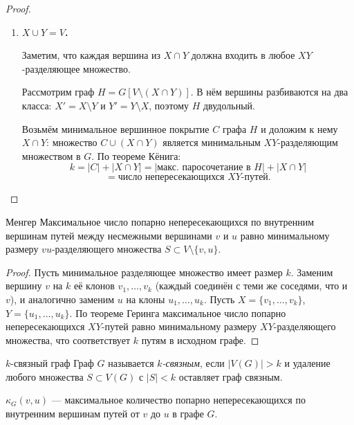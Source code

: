 \begin{proof}
\begin{enumerate}
\begin{enumerate}
			\item \textbf{$X \cup Y = V$.}
			
			Заметим, что каждая вершина из $X \cap Y$ должна входить
			в любое $XY$-разделяющее множество.
			
			Рассмотрим граф $H = G[V \setminus (X \cap Y)]$.
			В нём вершины разбиваются на два класса:
			$X' = X \setminus Y$ и
			$Y' = Y \setminus X$,
			поэтому $H$ двудольный.
			
			Возьмём минимальное вершинное покрытие $C$ графа $H$
			и доложим к нему $X \cap Y$: множество $C \cup (X \cap Y)$
			является минимальным $XY$-разделяющим множеством в $G$.
			По теореме Кёнига:
			\[
			k
			= \bigl|C\bigr| + \bigl|X \cap Y\bigr|
			= \bigl|\text{макс. паросочетание в } H\bigr|
			+ \bigl|X \cap Y\bigr| 
			\]
			\[
			= \text{число непересекающихся } XY\text{-путей.}
			\]
		\end{enumerate}
	\end{enumerate}
\end{proof}

\begin{Theorem}{Менгер}{}
	Максимальное число попарно непересекающихся по внутренним
	вершинам путей между несмежными вершинами $v$ и $u$ равно
	минимальному размеру $vu$-разделяющего множества
	$S \subset V \setminus \{v, u\}$.
\end{Theorem}
\begin{proof}
	Пусть минимальное разделяющее множество имеет размер $k$.
	Заменим вершину $v$ на $k$ её клонов $v_1, \ldots, v_k$
	(каждый соединён с теми же соседями, что и $v$),
	и аналогично заменим $u$ на клоны $u_1, \ldots, u_k$.
	Пусть $X = \{v_1,\ldots,v_k\}$, $Y = \{u_1,\ldots,u_k\}$.
	По теореме Геринга максимальное число попарно непересекающихся
	$XY$-путей равно минимальному размеру $XY$-разделяющего
	множества, что соответствует $k$ путям в исходном графе.
\end{proof}

\begin{Definition}{$k$-связный граф}{}
	Граф $G$ называется \emph{$k$-связным}, если
	$|V(G)| > k$ и удаление любого множества $S \subset V(G)$
	с $|S| < k$ оставляет граф связным.
\end{Definition}

\begin{Definition}{}{}
	$\kappa_G(v, u)$ --- максимальное количество попарно
	непересекающихся по внутренним вершинам путей от $v$ до $u$
	в графе $G$.
\end{Definition}

